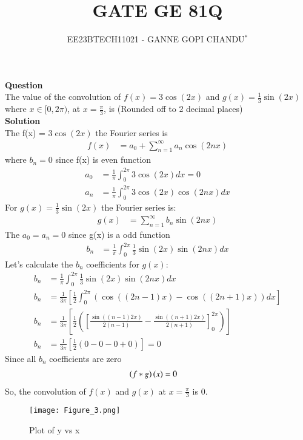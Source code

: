 \documentclass[journal,12pt,onecolumn]{IEEEtran}
\theoremstyle{remark}
\begin{document}

\vspace{3cm}
\title{GATE GE 81Q}
\author{EE23BTECH11021 - GANNE GOPI CHANDU$^{*}$%
}
\maketitle
\bigskip
\renewcommand{\thefigure}{\theenumi}
\renewcommand{\thetable}{\theenumi}

\textbf{Question}\\
The value of the convolution of $f(x) = 3\cos(2x)$ and $g(x) = \frac{1}{3}\sin(2x)$ where $x \in [0, 2\pi)$, at $x = \frac{\pi}{3}$, is (Rounded off to 2 decimal places)\\
\textbf{Solution}\\
The f(x) = $3\cos(2x)$ the  Fourier series is
\begin{align}
    f(x)&= a_0 + \sum_{n=1}^{\infty} a_n \cos(2nx)
\end{align}
where $b_n=0$ since  f(x)   is even function
\begin{align}
    a_0&= \frac{1}{\pi} \int_{0}^{2\pi} 3\cos(2x) dx = 0\\
    a_n&= \frac{1}{\pi} \int_{0}^{2\pi} 3\cos(2x) \cos(2nx) dx
\end{align}
 For $ g(x) = \frac{1}{3}\sin(2x) $ the Fourier series is:
 \begin{align}
     g(x)&= \sum_{n=1}^{\infty} b_n \sin(2nx)
 \end{align}
The $a_0=a_n=0$ since g(x) is a odd function
\begin{align}
   b_n&= \frac{1}{\pi} \int_{0}^{2\pi} \frac{1}{3}\sin(2x) \sin(2nx) dx 
\end{align}
Let's calculate the $ b_n $ coefficients for $ g(x) $:
\begin{align}
     b_n&= \frac{1}{\pi} \int_{0}^{2\pi} \frac{1}{3}\sin(2x) \sin(2nx) dx \\
     b_n&= \frac{1}{3\pi} \left[\frac{1}{2}\int_{0}^{2\pi} \left(\cos\left((2n-1)x\right) - \cos\left((2n+1)x\right)\right) dx\right]\\
     b_n&= \frac{1}{3\pi} \left[\frac{1}{2} \left(\left[\frac{\sin\left((n-1)2x\right)}{2(n-1)} - \frac{\sin\left((n+1)2x\right)}{2(n+1)}\right]_{0}^{2\pi}\right)\right] \\
     b_n&= \frac{1}{3\pi} \left[\frac{1}{2} \left(0 - 0 - 0 + 0\right)\right] = 0 
\end{align}
Since all $ b_n $ coefficients are zero
\begin{align}
    \left( f * g \right)(x)&= 0
\end{align}
So, the convolution of $f(x)$ and $g(x)$ at $x = \frac{\pi}{3}$ is $0$.
\begin{figure}
    \centering
    \texttt{[image: Figure\_3.png]}
    \caption{Plot of y vs x}
    \label{fig:2}
\end{figure}
\end{document}
